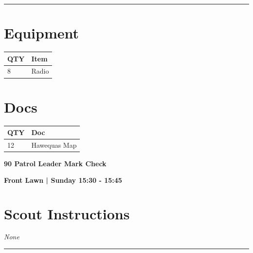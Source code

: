 \documentclass[10pt]{article}
\newcommand{\newtitle}[1]{\begin{center}{\Huge\bfseries #1 }\\ \vspace{5mm}\end{center}}
\newcommand{\newsubtitle}[1]{\begin{center}{\color{grey}\Large\bfseries #1 }\\ \vspace{5mm}\end{center}}
\begin{document}
			\vspace{0.5cm}
	\hrule
	\vspace{0.5cm}

	\begin{multicols}{2}

		\section*{\faWrench \: Equipment}

		
	\begin{center}
			\begin{tabular}{p{2cm}p{4cm}}


				\textbf{QTY} & \textbf{Item} \\\toprule
												8&Radio\\\midrule
								\end{tabular}

			\end{center}

		
		\vfill\null
		\columnbreak

			\section*{\faFile \: Docs}
		 	\begin{center}
			\begin{tabular}{p{2cm}p{4cm}}

			\textbf{QTY} & \textbf{Doc} \\\toprule
										12&Hawequas Map\\\midrule
							\end{tabular}
			\end{center}
	

		\vfill\null

		\end{multicols}



	\vspace{1cm}


	\clearpage
		\newtitle{90 Patrol Leader Mark Check }
	\newsubtitle{Front Lawn | Sunday 15:30 - 15:45}
		\setcounter{section}{89}
	\section*{Scout Instructions}
		\textit{None}
	
	\vspace{0.5cm}
	\hrule
	\vspace{0.5cm}
\end{document}
